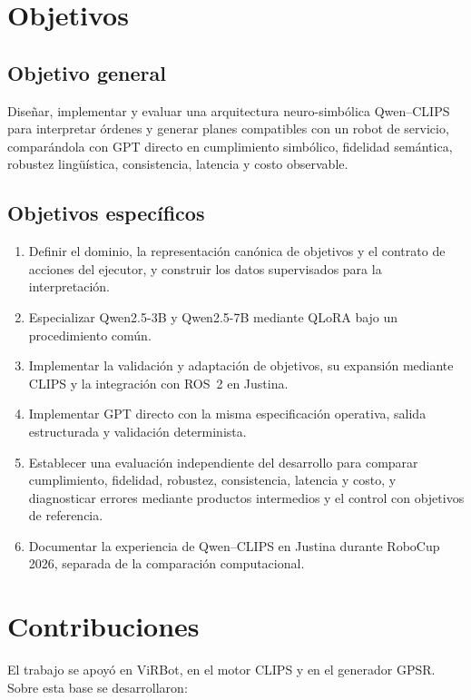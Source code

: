 \section{Objetivos}

\subsection{Objetivo general}

Diseñar, implementar y evaluar una arquitectura neuro-simbólica Qwen--CLIPS para interpretar órdenes y generar planes compatibles con un robot de servicio, comparándola con GPT directo en cumplimiento simbólico, fidelidad semántica, robustez lingüística, consistencia, latencia y costo observable.

\subsection{Objetivos específicos}

\begin{enumerate}
    \item Definir el dominio, la representación canónica de objetivos y el contrato de acciones del ejecutor, y construir los datos supervisados para la interpretación.
    \item Especializar Qwen2.5-3B y Qwen2.5-7B mediante QLoRA bajo un procedimiento común.
    \item Implementar la validación y adaptación de objetivos, su expansión mediante CLIPS y la integración con ROS~2 en Justina.
    \item Implementar GPT directo con la misma especificación operativa, salida estructurada y validación determinista.
    \item Establecer una evaluación independiente del desarrollo para comparar cumplimiento, fidelidad, robustez, consistencia, latencia y costo, y diagnosticar errores mediante productos intermedios y el control con objetivos de referencia.
    \item Documentar la experiencia de Qwen--CLIPS en Justina durante RoboCup 2026, separada de la comparación computacional.
\end{enumerate}

\section{Contribuciones}

El trabajo se apoyó en ViRBot, en el motor CLIPS y en el generador GPSR. Sobre esta base se desarrollaron:

